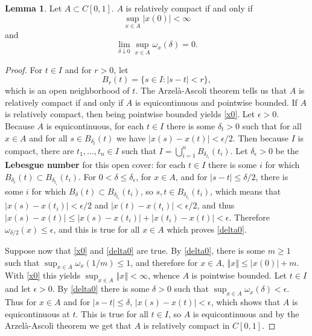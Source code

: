 \documentclass{article}
\newcommand{\norm}[1]{\left\Vert #1 \right\Vert}
\theoremstyle{definition}
\newtheorem{lemma}[theorem]{Lemma}
\theoremstyle{definition}
\begin{document}
\begin{lemma}
Let $A \subset C[0,1]$. $A$ is relatively compact if and only if 
\begin{equation}
\sup_{x \in A} |x(0)|<\infty
\label{x0}
\end{equation}
and
\begin{equation}
\lim_{\delta \downarrow 0} \sup_{x \in A} \omega_x(\delta)=0.
\label{delta0}
\end{equation}
\end{lemma}
\begin{proof}
For $t \in I$ and for $r>0$, let
\[
B_r(t) = \{s \in I: |s-t|<r\},
\]
which is an open neighborhood of $t$.
The Arzel\`a-Ascoli theorem tells us that $A$ is relatively compact
if and only if $A$ is equicontinuous and pointwise bounded. If $A$ is relatively compact, then being pointwise bounded
yields \eqref{x0}. Let $\epsilon>0$. Because $A$ is equicontinuous, for each $t \in I$ there is some $\delta_t>0$ 
such that for all
$x \in A$ and for all
$s \in B_{\delta_t}(t)$ we have 
$|x(s)-x(t)|<\epsilon/2$. 
Then because $I$ is compact, 
there are $t_1,\ldots,t_n \in I$ such that $I = \bigcup_{i=1}^n B_{\delta_{t_i}}(t_i)$.
Let $\delta_\epsilon>0$ be the \textbf{Lebesgue number} for this open cover: for each $t \in I$ there is some
$i$ for which $B_{\delta_\epsilon}(t) \subset B_{\delta_{t_i}}(t_i)$.
For $0<\delta \leq \delta_\epsilon$, for $x \in A$,  and for $|s-t| \leq \delta/2$, 
there is some $i$ for which $B_\delta(t) \subset B_{\delta_{t_i}}(t_i)$, so $s,t \in B_{\delta_{t_i}}(t_i)$, which means that
$|x(s)-x(t_i)|<\epsilon/2$ and $|x(t)-x(t_i)|<\epsilon/2$, and thus
$|x(s)-x(t)| \leq |x(s)-x(t_i)|+|x(t_i)-x(t)| < \epsilon$. 
Therefore $\omega_{\delta/2}(x) \leq \epsilon$, and this is true for all $x \in A$ which proves \eqref{delta0}.

Suppose now that \eqref{x0} and \eqref{delta0} are true. 
By \eqref{delta0}, there is some $m \geq 1$ such that
$\sup_{x \in A} \omega_x(1/m) \leq 1$, and therefore
for $x \in A$, $\norm{x} \leq |x(0)|+m$.
With \eqref{x0} this yields
$\sup_{x \in A} \norm{x}<\infty$, whence $A$ is pointwise bounded. 
Let $t \in I$ and let $\epsilon>0$. By \eqref{delta0} there is some $\delta>0$ such that
$\sup_{x \in A} \omega_x(\delta) < \epsilon$. Thus for 
$x \in A$ and for $|s-t| \leq \delta$, $|x(s)-x(t)|<\epsilon$, which shows that $A$ is equicontinuous at $t$. 
This is true for all $t \in I$, so $A$ is equicontinuous and by the Arzel\`a-Ascoli theorem we get that
$A$ is relatively compact in $C[0,1]$.
\end{proof}
\end{document}
